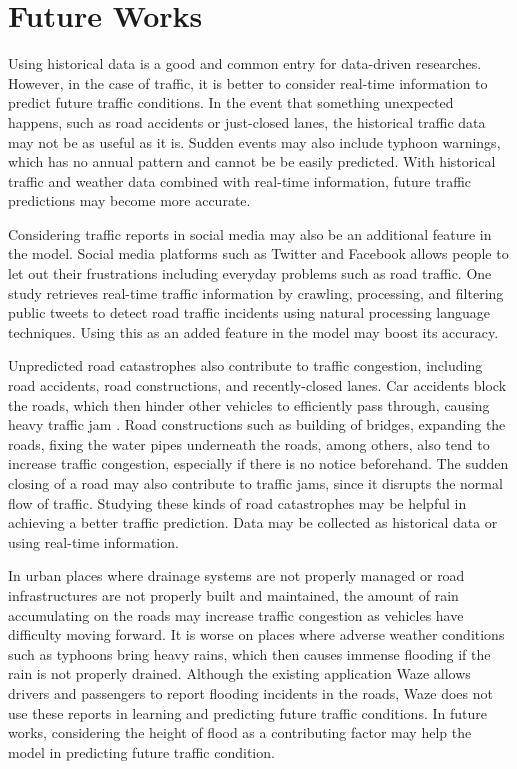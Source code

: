 \chapter{Future Works}

Using historical data is a good and common entry for data-driven researches. However, in the case of traffic, it is better to consider real-time information to predict future traffic conditions. In the event that something unexpected happens, such as road accidents or just-closed lanes, the historical traffic data may not be as useful as it is. Sudden events may also include typhoon warnings, which has no annual pattern and cannot be be easily predicted. With historical traffic and weather data combined with real-time information, future traffic predictions may become more accurate.

Considering traffic reports in social media may also be an additional feature in the model. Social media platforms such as Twitter and Facebook allows people to let out their frustrations including everyday problems such as road traffic. One study  retrieves real-time traffic information by crawling, processing, and filtering public tweets to detect road traffic incidents using natural processing language techniques. Using this as an added feature in the model may boost its accuracy. 

Unpredicted road catastrophes also contribute to traffic congestion, including road accidents, road constructions, and recently-closed lanes. Car accidents block the roads, which then hinder other vehicles to efficiently pass through, causing heavy traffic jam . Road constructions such as building of bridges, expanding the roads, fixing the water pipes underneath the roads, among others, also tend to increase traffic congestion, especially if there is no notice beforehand. The sudden closing of a road may also contribute to traffic jams, since it disrupts the normal flow of traffic. Studying these kinds of road catastrophes may be helpful in achieving a better traffic prediction. Data may be collected as historical data or using real-time information.

In urban places where drainage systems are not properly managed or road infrastructures are not properly built and maintained, the amount of rain accumulating on the roads may increase traffic congestion as vehicles have difficulty moving forward. It is worse on places where adverse weather conditions such as typhoons bring heavy rains, which then causes immense flooding if the rain is not properly drained. Although the existing application Waze allows drivers and passengers to report flooding incidents in the roads, Waze does not use these reports in learning and predicting future traffic conditions. In future works, considering the height of flood as a contributing factor may help the model in predicting future traffic condition. 
